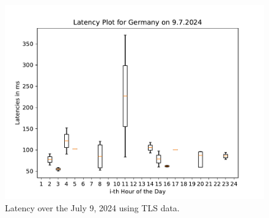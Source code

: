 \begin{figure}
	\includegraphics[width=\textwidth]{./chapters/appendix/img/latency_plot_for_germany_on_9.7.2024.pdf}
	\caption{Latency over the July 9, 2024 using TLS data.}
	\label{fig:tls-analysis-individual-day}
\end{figure}

